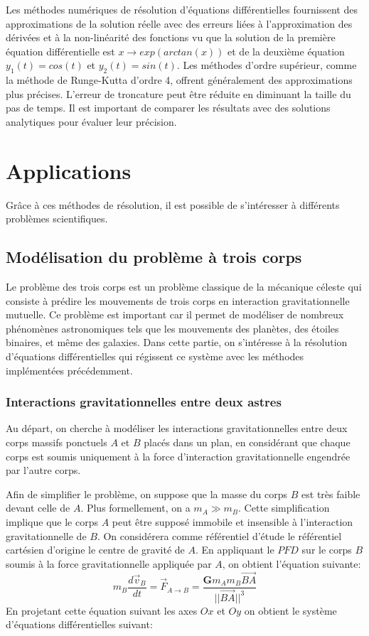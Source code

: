 \documentclass{article}
\begin{document}
Les méthodes numériques de résolution d'équations différentielles fournissent des approximations de la solution réelle avec des erreurs liées à l'approximation des dérivées et à la non-linéarité des fonctions vu que la solution de la première équation différentielle est $x\longrightarrow exp(arctan(x))$ et de la deuxième équation $y_{1}(t)=cos(t)$ et $y_{2}(t)=sin(t)$. Les méthodes d'ordre supérieur, comme la méthode de Runge-Kutta d'ordre 4, offrent généralement des approximations plus précises. L'erreur de troncature peut être réduite en diminuant la taille du pas de temps. Il est important de comparer les résultats avec des solutions analytiques pour évaluer leur précision.

\section{Applications}
Grâce à ces méthodes de résolution, il est possible de s'intéresser à différents problèmes scientifiques.

\subsection{Modélisation du problème à trois corps}
Le problème des trois corps est un problème classique de la mécanique céleste qui consiste à prédire les mouvements de trois corps en interaction gravitationnelle mutuelle. Ce problème est important car il permet de modéliser de nombreux phénomènes astronomiques tels que les mouvements des planètes, des étoiles binaires, et même des galaxies. Dans cette partie, on s'intéresse à la résolution d'équations différentielles qui régissent ce système avec les méthodes implémentées précédemment. 

\subsubsection{Interactions gravitationnelles entre deux astres}
Au départ, on cherche à modéliser les interactions gravitationnelles entre deux corps massifs ponctuels $A$ et $B$ placés dans un plan, en considérant que chaque corps est soumis uniquement à la force d'interaction gravitationnelle engendrée par l'autre corps.

Afin de simplifier le problème, on suppose que la masse du corps $B$ est très faible devant celle de $A$. Plus formellement, on a $m_{A} \gg m_{B}$. Cette simplification implique que le corps $A$ peut être supposé immobile et insensible à l’interaction gravitationnelle de $B$.
On considérera comme référentiel d'étude le référentiel cartésien d'origine le centre de gravité de $A$. En appliquant le $PFD$ sur le corps $B$ soumis à la force gravitationnelle appliquée par $A$, on obtient l'équation suivante:
\[ 
m_{B}\frac{d\overrightarrow v_{B}}{dt} = \overrightarrow{F}_{A\to B} = \frac{\mathbf{G} m_{A}m_{B} \overrightarrow{BA} }{||\overrightarrow{BA} ||^{3}} \]
En projetant cette équation suivant les axes $Ox$ et $Oy$ on obtient le système d'équations différentielles suivant:
\end{document}
